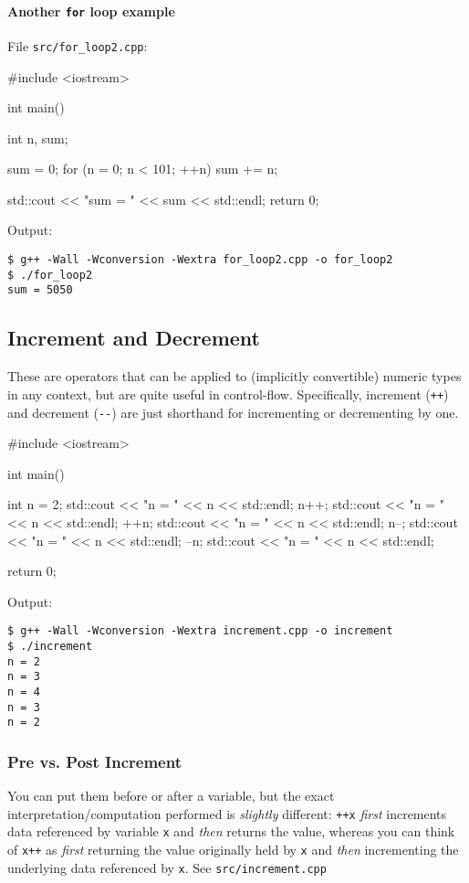 \documentclass[12pt,letterpaper,twoside]{article}
\begin{document}
\paragraph{\texorpdfstring{Another \texttt{for} loop
example}{Another for loop example}}

File \texttt{src/for\_loop2.cpp}:
\begin{cpp}
#include <iostream>

int main() {
  int n, sum;

  sum = 0;
  for (n = 0; n < 101; ++n) {
    sum += n;
  }

  std::cout << "sum = " << sum << std::endl;
  return 0;
}
\end{cpp}

Output:

\begin{verbatim}
$ g++ -Wall -Wconversion -Wextra for_loop2.cpp -o for_loop2
$ ./for_loop2
sum = 5050
\end{verbatim}

\subsection{Increment and Decrement}
These are operators that can be applied to (implicitly convertible)
numeric types in any context, but are quite useful in control-flow.
Specifically, increment (\texttt{++}) and decrement (\texttt{-\/-}) are just
shorthand for incrementing or decrementing by one.

\begin{cpp}
#include <iostream>

int main() {
  int n = 2;
  std::cout << "n = " << n << std::endl;
  n++;
  std::cout << "n = " << n << std::endl;
  ++n;
  std::cout << "n = " << n << std::endl;
  n--;
  std::cout << "n = " << n << std::endl;
  --n;
  std::cout << "n = " << n << std::endl;

  return 0;
}
\end{cpp}

Output:

\begin{verbatim}
$ g++ -Wall -Wconversion -Wextra increment.cpp -o increment
$ ./increment
n = 2
n = 3
n = 4
n = 3
n = 2
\end{verbatim}


\subsubsection{Pre vs. Post Increment}
You can put them before or after a variable, but the exact
interpretation/computation performed is \emph{slightly} different:
\texttt{++x} \emph{first} increments data referenced by variable \texttt{x} and
\emph{then} returns the value, whereas you can think of \texttt{x++}
as \emph{first}
returning the value originally held by \texttt{x} and \emph{then}
incrementing the underlying data referenced by \texttt{x}.
See \texttt{src/increment.cpp}
\end{document}
